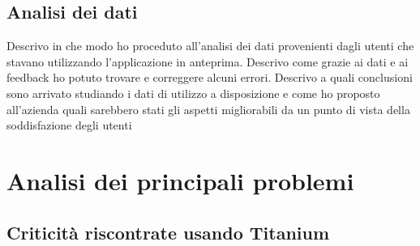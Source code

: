 		\subsection{Analisi dei dati}
			Descrivo in che modo ho proceduto all'analisi dei dati provenienti dagli utenti che stavano utilizzando l'applicazione in
			anteprima. Descrivo come grazie ai dati e ai feedback ho potuto trovare e correggere alcuni errori. Descrivo a quali
			conclusioni sono arrivato studiando i dati di utilizzo a disposizione e come ho proposto all'azienda quali sarebbero stati
			gli aspetti migliorabili da un punto di vista della soddisfazione degli utenti
	\section{Analisi dei principali problemi}
		\subsection{Criticità riscontrate usando Titanium}
